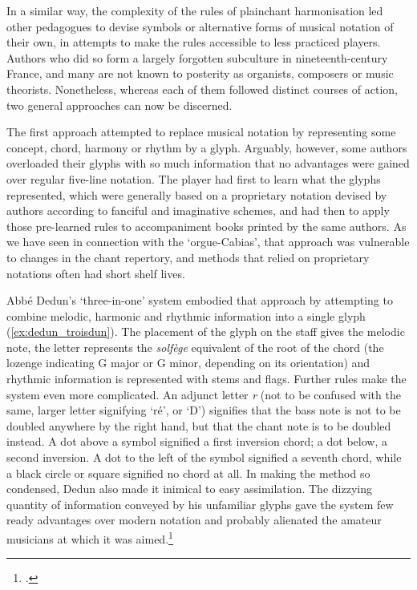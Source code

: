In a similar way, the complexity of the rules of plainchant harmonisation led other pedagogues to devise symbols or alternative forms of musical notation of their own, in attempts to make the rules accessible to less practiced players.
Authors who did so form a largely forgotten subculture in nineteenth-century France, and many are not known to posterity as organists, composers or music theorists.
Nonetheless, whereas each of them followed distinct courses of action, two general approaches can now be discerned.

The first approach attempted to replace musical notation by representing some concept, chord, harmony or rhythm by a glyph.
Arguably, however, some authors overloaded their glyphs with so much information that no advantages were gained over regular five-line notation.
The player had first to learn what the glyphs represented, which were generally based on a proprietary notation devised by authors according to fanciful and imaginative schemes, and had then to apply those pre-learned rules to accompaniment books printed by the same authors.
As we have seen in connection with the `orgue-Cabias', that approach was vulnerable to changes in the chant repertory, and methods that relied on proprietary notations often had short shelf lives.
\noclub[2]

%
Abbé Dedun's `three-in-one' system embodied that approach by attempting to combine melodic, harmonic and rhythmic information into a single glyph (\cref{ex:dedun_troisdun}).
The placement of the glyph on the staff gives the melodic note, the letter represents the \emph{solfège} equivalent of the root of the chord (the lozenge indicating G major or G minor, depending on its orientation) and rhythmic information is represented with stems and flags.
Further rules make the system even more complicated.
An adjunct letter \textit{r} (not to be confused with the same, larger letter signifying `ré', or `D') signifies that the bass note is not to be doubled anywhere by the right hand, but that the chant note is to be doubled instead.
A dot above a symbol signified a first inversion chord; a dot below, a second inversion.
A dot to the left of the symbol signified a seventh chord, while a black circle or square signified no chord at all.
In making the method so condensed, Dedun also made it inimical to easy assimilation.
The dizzying quantity of information conveyed by his unfamiliar glyphs gave the system few ready advantages over modern notation and probably alienated the amateur musicians at which it was aimed.\footcite[10]{Dedunsystemetroisou1889}
\noclub[2]

